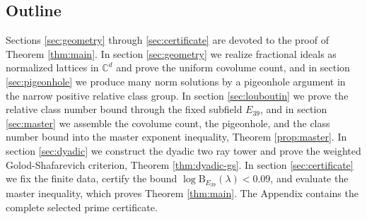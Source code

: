 \subsection{Outline}

Sections \ref{sec:geometry} through \ref{sec:certificate} are devoted
to the proof of Theorem \ref{thm:main}. In section \ref{sec:geometry}
we realize fractional ideals as normalized lattices in $\mathbb{C}^{d}$
and prove the uniform covolume count, and in section
\ref{sec:pigeonhole} we produce many norm solutions by a pigeonhole
argument in the narrow positive relative class group. In section
\ref{sec:louboutin} we prove the relative class number bound through
the fixed subfield $E_{39}$, and in section \ref{sec:master} we
assemble the covolume count, the pigeonhole, and the class number bound
into the master exponent inequality, Theorem \ref{prop:master}. In
section \ref{sec:dyadic} we construct the dyadic two ray tower and
prove the weighted Golod-Shafarevich criterion, Theorem
\ref{thm:dyadic-gs}. In section \ref{sec:certificate} we fix the
finite data, certify the bound $\log\mathrm{B}_{E_{39}}(\lambda)<0.09$,
and evaluate the master inequality, which proves Theorem
\ref{thm:main}. The Appendix contains the complete selected prime
certificate.
